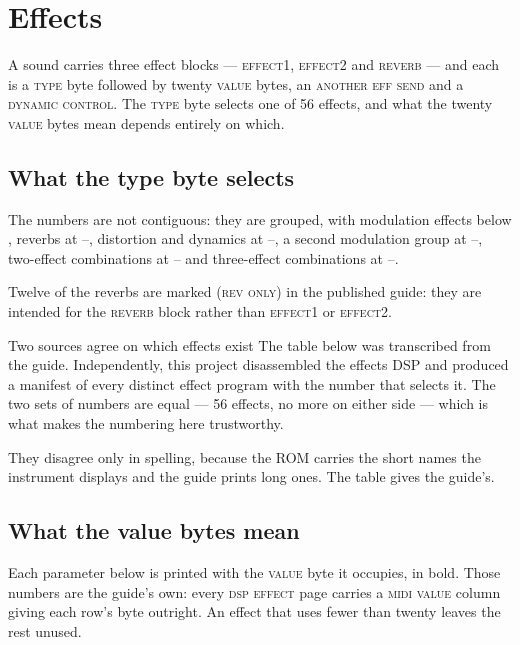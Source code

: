 \chapter{Effects}\label{ch:effects}

A sound carries three effect blocks --- \textsc{effect1}, \textsc{effect2} and
\textsc{reverb} --- and each is a \textsc{type} byte followed by twenty \textsc{value}
bytes, an \textsc{another eff send} and a \textsc{dynamic control}. The \textsc{type} byte
selects one of 56 effects, and what the twenty \textsc{value} bytes mean depends entirely
on which.

\section{What the type byte selects}
The numbers are not contiguous: they are grouped, with modulation effects below
, reverbs at --, distortion and dynamics at
--, a second modulation group at --, two-effect
combinations at -- and three-effect combinations at
--.

Twelve of the reverbs are marked \textsc{(rev only)} in the published guide: they are
intended for the \textsc{reverb} block rather than \textsc{effect1} or \textsc{effect2}.

\begin{note}{Two sources agree on which effects exist}
The table below was transcribed from the guide. Independently, this project
disassembled the effects DSP and produced a manifest of every distinct effect program
with the number that selects it. The two sets of numbers are equal --- 56 effects,
no more on either side --- which is what makes the numbering here trustworthy.

They disagree only in spelling, because the ROM carries the short names the instrument
displays and the guide prints long ones. The table gives the guide's.
\end{note}

\section{What the value bytes mean}
Each parameter below is printed with the \textsc{value} byte it occupies, in bold. Those
numbers are the guide's own: every \textsc{dsp effect} page carries a \textsc{midi value}
column giving each row's byte outright. An effect that uses fewer than twenty leaves the
rest unused.

